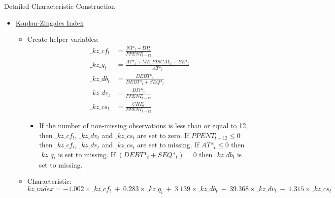 \documentclass[12pt,title,fleqn]{article}
\begin{document}
\begin{section}{Detailed Characteristic Construction}
\begin{itemize}
        \item \hyperlink{kap2}{\hypertarget{kap}{Kaplan-Zingales Index}}
            \begin{itemize}
                \item Create helper variables:
                    \begin{align*}
                        \_kz\_cf_t &= \frac{NI\mbox{*}_t + DP_t}{PPENT_{t-12}} \\
                        \_kz\_q_t &= \frac{AT\mbox{*}_t + ME\_FISCAL_t - BE\mbox{*}_t}{AT\mbox{*}_t} \\
                        \_kz\_db_t &= \frac{DEBT\mbox{*}_t}{DEBT\mbox{*}_t + SEQ\mbox{*}_t} \\
                        \_kz\_dv_t &= \frac{DIV\mbox{*}_t}{PPENT_{t-12}} \\
                        \_kz\_cs_t &= \frac{CHE_t}{PPENT_{t-12}}
                    \end{align*}
                    \begin{itemize}
                        \item If the number of non-missing observations is less than or equal to 12, then $\_kz\_cf_t$, $\_kz\_dv_t$ and $\_kz\_cs_t$ are set to zero. If $PPENT_{t-12} \leq 0$ then $\_kz\_cf_t$, $\_kz\_dv_t$ and $\_kz\_cs_t$ are set to missing. If $AT\mbox{*}_t \leq 0$ then $\_kz\_q_t$ is set to missing. If $(DEBT\mbox{*}_t + SEQ\mbox{*}_t) = 0$ then $\_kz\_db_t$ is set to missing.
                    \end{itemize}
                
                \item Characteristic:
                    \begin{equation*}
                        kz\_index = -1.002 \times \_kz\_cf_t \:+\: 0.283 \times \_kz\_q_t \:+\: 3.139 \times \_kz\_db_t \:-\: 39.368 \times \_kz\_dv_t \:-\: 1.315 \times \_kz\_cs_t
                    \end{equation*}
            \end{itemize}
            

\end{itemize}
\end{section}
\end{document}
